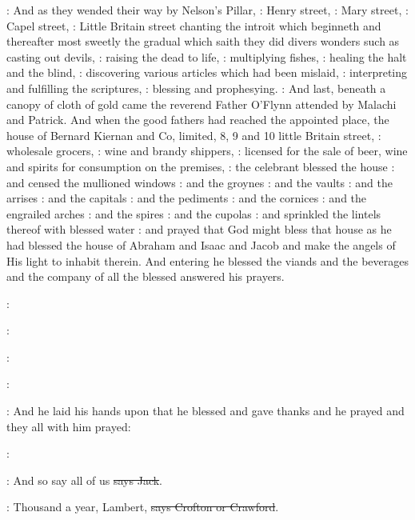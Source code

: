 :
And as they wended their way by Nelson's Pillar,
:
Henry street,
:
Mary street,
:
Capel street,
:
Little Britain street
chanting the introit  which beginneth
 and thereafter most sweetly the gradual
 which saith 
they did divers wonders such as casting out devils,
:
raising the dead to life,
:
multiplying fishes,
:
healing the halt and the blind,
:
discovering various articles which had been mislaid,
:
interpreting and fulfilling the scriptures,
:
blessing and prophesying.
:
And last, beneath
a canopy of cloth of gold came the reverend Father O'Flynn attended by
Malachi and Patrick. And when the good fathers had reached the appointed place,
the house of Bernard Kiernan and Co, limited, 8, 9 and 10 little Britain street,
:
wholesale grocers,
:
wine and brandy shippers,
:
licensed for the sale of beer, wine and spirits for consumption on the premises,
:
the celebrant blessed the house
:
and censed the mullioned windows 
:
and the groynes 
:
and the vaults 
:
and the arrises 
:
and the capitals 
:
and the pediments 
:
and the cornices 
:
and the engrailed arches 
:
and the spires 
:
and the cupolas 
:
and sprinkled the lintels thereof with blessed water
:
and prayed that God might bless that house as he had
blessed the house of Abraham and Isaac and Jacob and
make the angels of His light to inhabit therein.
And entering he blessed the viands and the beverages and the company of
all the blessed answered his prayers.

:

:

:

:

:
And he laid his hands upon that he blessed and gave thanks and he
prayed and they all with him prayed:

\All:

\power:
And so say all of us \sout{says Jack}.

\crofton:
Thousand a year, Lambert,
\sout{says Crofton or Crawford}.

